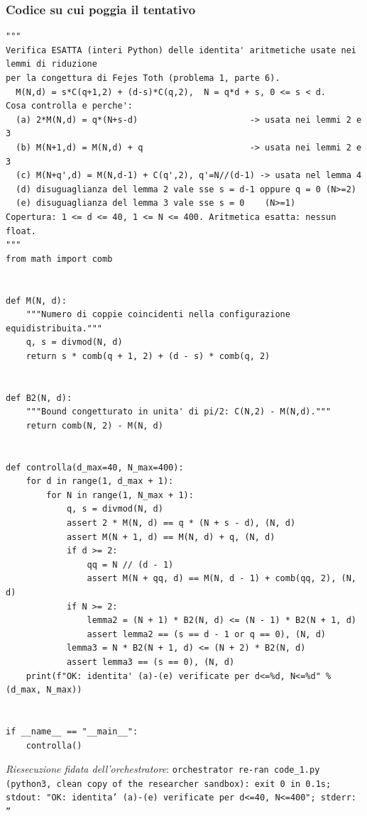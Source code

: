 \documentclass[11pt,a4paper]{article}
\begin{document}
\subsubsection{Codice su cui poggia il tentativo}
\begin{lstlisting}[caption={attempt\_001 code\_1 [python, rigore exact] — Exact integer check of the identities of Lemma 0 and of the equality/inequality conditions — verdetto del Referee: REJECT}]
"""
Verifica ESATTA (interi Python) delle identita' aritmetiche usate nei lemmi di riduzione
per la congettura di Fejes Toth (problema 1, parte 6).
  M(N,d) = s*C(q+1,2) + (d-s)*C(q,2),  N = q*d + s, 0 <= s < d.
Cosa controlla e perche':
  (a) 2*M(N,d) = q*(N+s-d)                      -> usata nei lemmi 2 e 3
  (b) M(N+1,d) = M(N,d) + q                     -> usata nei lemmi 2 e 3
  (c) M(N+q',d) = M(N,d-1) + C(q',2), q'=N//(d-1) -> usata nel lemma 4
  (d) disuguaglianza del lemma 2 vale sse s = d-1 oppure q = 0 (N>=2)
  (e) disuguaglianza del lemma 3 vale sse s = 0    (N>=1)
Copertura: 1 <= d <= 40, 1 <= N <= 400. Aritmetica esatta: nessun float.
"""
from math import comb


def M(N, d):
    """Numero di coppie coincidenti nella configurazione equidistribuita."""
    q, s = divmod(N, d)
    return s * comb(q + 1, 2) + (d - s) * comb(q, 2)


def B2(N, d):
    """Bound congetturato in unita' di pi/2: C(N,2) - M(N,d)."""
    return comb(N, 2) - M(N, d)


def controlla(d_max=40, N_max=400):
    for d in range(1, d_max + 1):
        for N in range(1, N_max + 1):
            q, s = divmod(N, d)
            assert 2 * M(N, d) == q * (N + s - d), (N, d)
            assert M(N + 1, d) == M(N, d) + q, (N, d)
            if d >= 2:
                qq = N // (d - 1)
                assert M(N + qq, d) == M(N, d - 1) + comb(qq, 2), (N, d)
            if N >= 2:
                lemma2 = (N + 1) * B2(N, d) <= (N - 1) * B2(N + 1, d)
                assert lemma2 == (s == d - 1 or q == 0), (N, d)
            lemma3 = N * B2(N + 1, d) <= (N + 2) * B2(N, d)
            assert lemma3 == (s == 0), (N, d)
    print(f"OK: identita' (a)-(e) verificate per d<=%d, N<=%d" % (d_max, N_max))


if __name__ == "__main__":
    controlla()

\end{lstlisting}
\noindent\emph{Riesecuzione fidata dell'orchestratore}: \texttt{orchestrator re-ran code\_1.py (python3, clean copy of the researcher sandbox): exit 0 in 0.1s; stdout: "OK: identita' (a)-(e) verificate per d\textless{}=40, N\textless{}=400"; stderr: ''}
\end{document}
